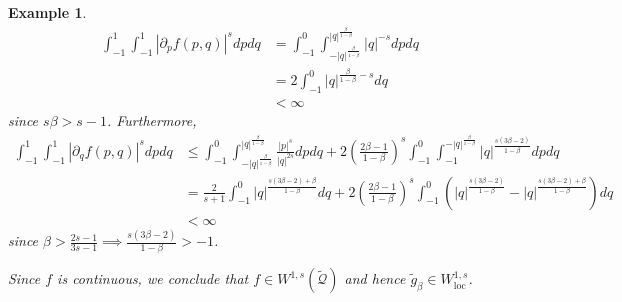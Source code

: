 \documentclass{article}
\newcommand{\Q}{\mathcal{Q}}
\newcommand{\loc}{\mathrm{loc}}
\newcommand{\Sp}{\mathbb{S}}
\newtheorem{example}[definition]{Example}
\begin{document}
\begin{example}
\begin{equation}
\begin{split}
    \int_{-1}^1\int_{-1}^1|\partial_pf(p,q)|^sdpdq&=\int_{-1}^0\int_{-|q|^{\frac{\beta}{1-\beta}}}^{|q|^{\frac{\beta}{1-\beta}}}|q|^{-s}dpdq\\
    &=2\int_{-1}^0|q|^{\frac{\beta}{1-\beta}-s}dq\\
    &<\infty
\end{split}
\end{equation}
since $s\beta>s-1$. Furthermore,
\begin{equation}
\begin{split}
    \int_{-1}^1\int_{-1}^1|\partial_qf(p,q)|^sdpdq&\leq\int_{-1}^0\int_{-|q|^{\frac{\beta}{1-\beta}}}^{|q|^{\frac{\beta}{1-\beta}}}\frac{|p|^s}{|q|^{2s}}dpdq+2\left(\frac{2\beta-1}{1-\beta}\right)^s\int_{-1}^0\int_{-1}^{-|q|^{\frac{\beta}{1-\beta}}}|q|^{\frac{s(3\beta-2)}{1-\beta}}dpdq\\
    &=\frac{2}{s+1}\int_{-1}^0|q|^{\frac{s(3\beta-2)+\beta}{1-\beta}}dq+2\left(\frac{2\beta-1}{1-\beta}\right)^s\int_{-1}^{0}\left(|q|^{\frac{s(3\beta-2)}{1-\beta}}-|q|^{\frac{s(3\beta-2)+\beta}{1-\beta}}\right)dq\\
    &<\infty
\end{split}
\end{equation}
since $\beta>\frac{2s-1}{3s-1}\implies\frac{s(3\beta-2)}{1-\beta}>-1$.

Since $f$ is continuous, we conclude that $f\in W^{1,s}(\tilde{\Q})$ and hence $\tilde{g}_{\beta}\in W^{1,s}_{\loc}$.



\end{example}
\end{document}
